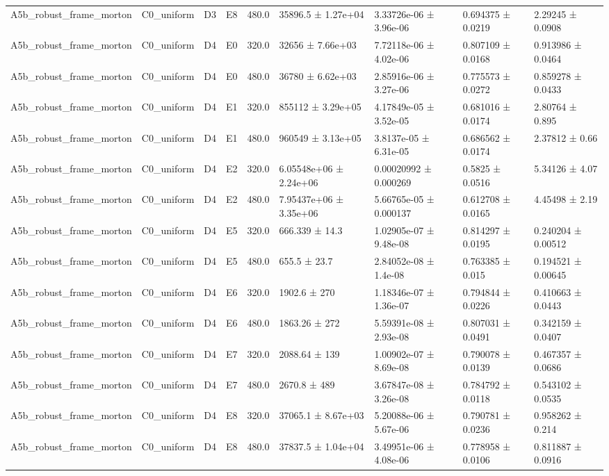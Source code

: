 \begin{table}
\begin{tabular}{lllllllll}
A5b\_robust\_frame\_morton & C0\_uniform & D3 & E8 & 480.0 & 35896.5 ± 1.27e+04 & 3.33726e-06 ± 3.96e-06 & 0.694375 ± 0.0219 & 2.29245 ± 0.0908 \\
A5b\_robust\_frame\_morton & C0\_uniform & D4 & E0 & 320.0 & 32656 ± 7.66e+03 & 7.72118e-06 ± 4.02e-06 & 0.807109 ± 0.0168 & 0.913986 ± 0.0464 \\
A5b\_robust\_frame\_morton & C0\_uniform & D4 & E0 & 480.0 & 36780 ± 6.62e+03 & 2.85916e-06 ± 3.27e-06 & 0.775573 ± 0.0272 & 0.859278 ± 0.0433 \\
A5b\_robust\_frame\_morton & C0\_uniform & D4 & E1 & 320.0 & 855112 ± 3.29e+05 & 4.17849e-05 ± 3.52e-05 & 0.681016 ± 0.0174 & 2.80764 ± 0.895 \\
A5b\_robust\_frame\_morton & C0\_uniform & D4 & E1 & 480.0 & 960549 ± 3.13e+05 & 3.8137e-05 ± 6.31e-05 & 0.686562 ± 0.0174 & 2.37812 ± 0.66 \\
A5b\_robust\_frame\_morton & C0\_uniform & D4 & E2 & 320.0 & 6.05548e+06 ± 2.24e+06 & 0.00020992 ± 0.000269 & 0.5825 ± 0.0516 & 5.34126 ± 4.07 \\
A5b\_robust\_frame\_morton & C0\_uniform & D4 & E2 & 480.0 & 7.95437e+06 ± 3.35e+06 & 5.66765e-05 ± 0.000137 & 0.612708 ± 0.0165 & 4.45498 ± 2.19 \\
A5b\_robust\_frame\_morton & C0\_uniform & D4 & E5 & 320.0 & 666.339 ± 14.3 & 1.02905e-07 ± 9.48e-08 & 0.814297 ± 0.0195 & 0.240204 ± 0.00512 \\
A5b\_robust\_frame\_morton & C0\_uniform & D4 & E5 & 480.0 & 655.5 ± 23.7 & 2.84052e-08 ± 1.4e-08 & 0.763385 ± 0.015 & 0.194521 ± 0.00645 \\
A5b\_robust\_frame\_morton & C0\_uniform & D4 & E6 & 320.0 & 1902.6 ± 270 & 1.18346e-07 ± 1.36e-07 & 0.794844 ± 0.0226 & 0.410663 ± 0.0443 \\
A5b\_robust\_frame\_morton & C0\_uniform & D4 & E6 & 480.0 & 1863.26 ± 272 & 5.59391e-08 ± 2.93e-08 & 0.807031 ± 0.0491 & 0.342159 ± 0.0407 \\
A5b\_robust\_frame\_morton & C0\_uniform & D4 & E7 & 320.0 & 2088.64 ± 139 & 1.00902e-07 ± 8.69e-08 & 0.790078 ± 0.0139 & 0.467357 ± 0.0686 \\
A5b\_robust\_frame\_morton & C0\_uniform & D4 & E7 & 480.0 & 2670.8 ± 489 & 3.67847e-08 ± 3.26e-08 & 0.784792 ± 0.0118 & 0.543102 ± 0.0535 \\
A5b\_robust\_frame\_morton & C0\_uniform & D4 & E8 & 320.0 & 37065.1 ± 8.67e+03 & 5.20088e-06 ± 5.67e-06 & 0.790781 ± 0.0236 & 0.958262 ± 0.214 \\
A5b\_robust\_frame\_morton & C0\_uniform & D4 & E8 & 480.0 & 37837.5 ± 1.04e+04 & 3.49951e-06 ± 4.08e-06 & 0.778958 ± 0.0106 & 0.811887 ± 0.0916 \\

\end{tabular}
\end{table}

